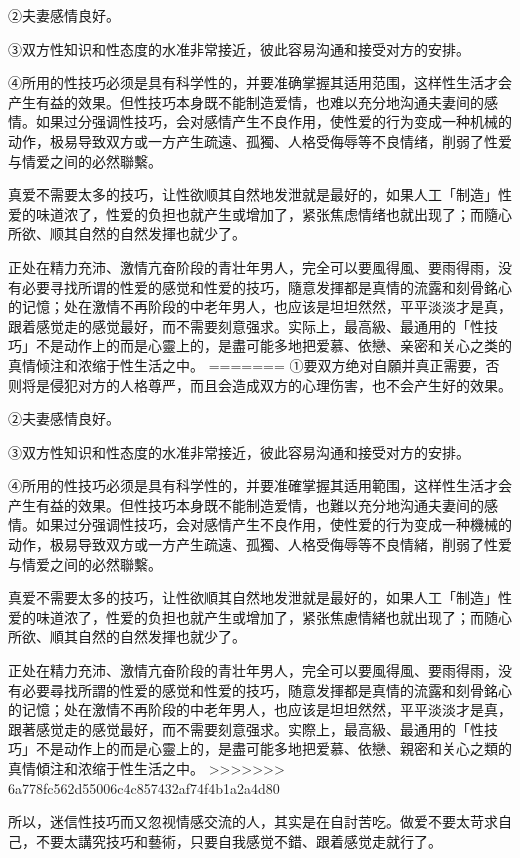 \documentclass[12pt,UTF8]{ctexbook}
\begin{document}
②夫妻感情良好。

③双方性知识和性态度的水准非常接近，彼此容易沟通和接受对方的安排。

④所用的性技巧必须是具有科学性的，并要准确掌握其适用范围，这样性生活才会产生有益的效果。但性技巧本身既不能制造爱情，也难以充分地沟通夫妻间的感情。如果过分强调性技巧，会对感情产生不良作用，使性爱的行为变成一种机械的动作，极易导致双方或一方产生疏遠、孤獨、人格受侮辱等不良情绪，削弱了性爱与情爱之间的必然聯繫。

真爱不需要太多的技巧，让性欲顺其自然地发泄就是最好的，如果人工「制造」性爱的味道浓了，性爱的负担也就产生或增加了，紧张焦虑情绪也就出现了；而隨心所欲、顺其自然的自然发揮也就少了。

正处在精力充沛、激情亢奋阶段的青壮年男人，完全可以要風得風、要雨得雨，没有必要寻找所谓的性爱的感觉和性爱的技巧，隨意发揮都是真情的流露和刻骨銘心的记憶；处在激情不再阶段的中老年男人，也应该是坦坦然然，平平淡淡才是真，跟着感觉走的感觉最好，而不需要刻意强求。实际上，最高級、最通用的「性技巧」不是动作上的而是心靈上的，是盡可能多地把爱慕、依戀、亲密和关心之类的真情倾注和浓缩于性生活之中。
=======
①要双方绝对自願并真正需要，否则将是侵犯对方的人格尊严，而且会造成双方的心理伤害，也不会产生好的效果。

②夫妻感情良好。

③双方性知识和性态度的水准非常接近，彼此容易沟通和接受对方的安排。

④所用的性技巧必须是具有科学性的，并要准確掌握其适用範围，这样性生活才会产生有益的效果。但性技巧本身既不能制造爱情，也難以充分地沟通夫妻间的感情。如果过分强调性技巧，会对感情产生不良作用，使性爱的行为变成一种機械的动作，极易导致双方或一方产生疏遠、孤獨、人格受侮辱等不良情緒，削弱了性爱与情爱之间的必然聯繫。

真爱不需要太多的技巧，让性欲順其自然地发泄就是最好的，如果人工「制造」性爱的味道浓了，性爱的负担也就产生或增加了，紧张焦慮情緒也就出现了；而随心所欲、順其自然的自然发揮也就少了。

正处在精力充沛、激情亢奋阶段的青壮年男人，完全可以要風得風、要雨得雨，没有必要尋找所謂的性爱的感觉和性爱的技巧，随意发揮都是真情的流露和刻骨銘心的记憶；处在激情不再阶段的中老年男人，也应该是坦坦然然，平平淡淡才是真，跟著感觉走的感觉最好，而不需要刻意强求。实際上，最高級、最通用的「性技巧」不是动作上的而是心靈上的，是盡可能多地把爱慕、依戀、親密和关心之類的真情傾注和浓缩于性生活之中。
>>>>>>> 6a778fc562d55006c4c857432af74f4b1a2a4d80

所以，迷信性技巧而又忽视情感交流的人，其实是在自討苦吃。做爱不要太苛求自己，不要太講究技巧和藝術，只要自我感觉不錯、跟着感觉走就行了。
\end{document}
